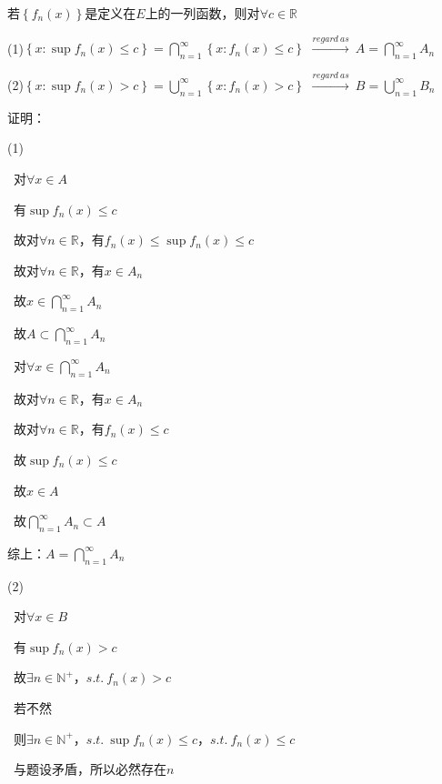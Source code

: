 \begin{eg}
    若$\left\{f_{n}(x)\right\} $是定义在$E$上的一列函数，则对$\forall c \in \mathbb{R}$
\par (1)$\left\{x : \sup f_{n}(x) \leqslant c\right\} = \bigcap \limits_{n=1}^{\infty} \left\{x : f_{n}(x) \leqslant c\right\} $ \quad $\xrightarrow{regard \ as} \ A = \bigcap \limits_{n=1}^{\infty}A_{n}$
\par (2)$\left\{x : \sup f_{n}(x) > c\right\} = \bigcup \limits_{n=1}^{\infty} \left\{x : f_{n}(x) > c\right\} $ \quad $\xrightarrow{regard \ as} \ B = \bigcup \limits_{n=1}^{\infty}B_{n}$
\end{eg}
\noindent 证明：
\par (1) 
\par {} \ 对$\forall x \in A$
\par \quad \ 有$\sup f_{n}(x) \leqslant c$
\par \quad \ 故对$\forall n \in \mathbb{R}$，有$f_{n}(x) \leqslant \sup f_{n}(x) \leqslant c$
\par \quad \ 故对$\forall n \in \mathbb{R}$，有$x \in A_{n}$
\par \quad \ 故$ x \in \bigcap \limits_{n=1}^{\infty}A_{n}$
\par \quad \ 故$ A \subset \bigcap \limits_{n=1}^{\infty}A_{n}$
\par {} \ 对$\forall x \in \bigcap \limits_{n=1}^{\infty}A_{n}$
\par \quad \ 故对$\forall n \in \mathbb{R}$，有$x \in A_{n}$
\par \quad \ 故对$\forall n \in \mathbb{R}$，有$f_{n}(x) \leqslant c$
\par \quad \ 故$ \sup f_{n}(x) \leqslant c$
\par \quad \ 故$ x \in A$
\par \quad \ 故$ \bigcap \limits_{n=1}^{\infty}A_{n} \subset A$
\par 综上：$A = \bigcap \limits_{n=1}^{\infty}A_{n}$
\par (2) 
\par {} \ 对$\forall x \in B$
\par \quad \ 有$\sup f_{n}(x) > c$
\par \quad \ 故$\exists n \in \mathbb{N}^{+}$，$s.t. \ f_{n}(x) > c$
\par \quad \ 若不然
\par \quad \ 则$\exists n \in \mathbb{N}^{+}$，$s.t. \ \sup f_{n}(x) \leqslant c$，$s.t. \ f_{n}(x) \leqslant c$ 
\par \quad \ 与题设矛盾，所以必然存在$n$
